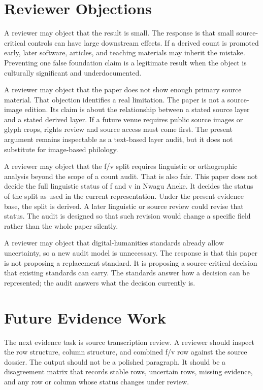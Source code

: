 \documentclass[sigconf,nonacm]{acmart}
\begin{document}
\section{Reviewer Objections}
A reviewer may object that the result is small. The response is that small
source-critical controls can have large downstream effects. If a derived count
is promoted early, later software, articles, and teaching materials may inherit
the mistake. Preventing one false foundation claim is a legitimate result when
the object is culturally significant and underdocumented.

A reviewer may object that the paper does not show enough primary source
material. That objection identifies a real limitation. The paper is not a
source-image edition. Its claim is about the relationship between a stated
source layer and a stated derived layer. If a future venue requires public
source images or glyph crops, rights review and source access must come first.
The present argument remains inspectable as a text-based layer audit, but it
does not substitute for image-based philology.

A reviewer may object that the f/v split requires linguistic or orthographic
analysis beyond the scope of a count audit. That is also fair. This paper does
not decide the full linguistic status of f and v in Nwagu Aneke. It decides the
status of the split as used in the current representation. Under the present
evidence base, the split is derived. A later linguistic or source review could
revise that status. The audit is designed so that such revision would change a
specific field rather than the whole paper silently.

A reviewer may object that digital-humanities standards already allow
uncertainty, so a new audit model is unnecessary. The response is that this
paper is not proposing a replacement standard. It is proposing a source-critical
decision that existing standards can carry. The standards answer how a decision
can be represented; the audit answers what the decision currently is.

\section{Future Evidence Work}
The next evidence task is source transcription review. A reviewer should inspect
the row structure, column structure, and combined f/v row against the source
dossier. The output should not be a polished paragraph. It should be a
disagreement matrix that records stable rows, uncertain rows, missing evidence,
and any row or column whose status changes under review.
\end{document}
